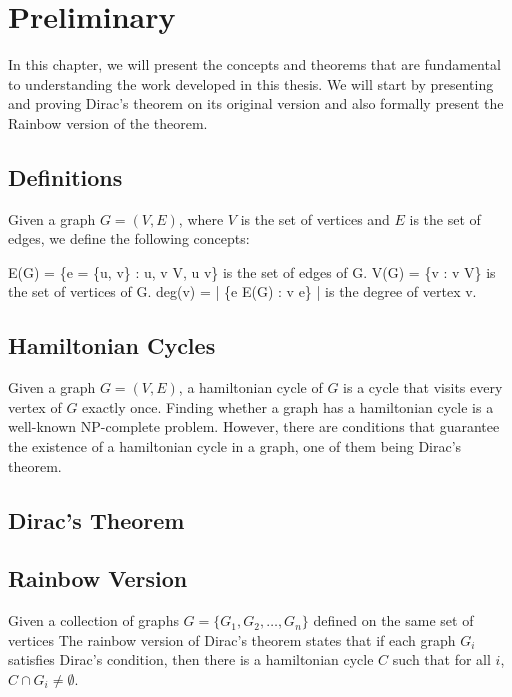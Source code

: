 
\chapter{Preliminary}

In this chapter, we will present the concepts and theorems that are fundamental to understanding the 
work developed in this thesis. We will start by presenting and proving Dirac's theorem on its original
version and also formally present the Rainbow version of the theorem.

\section{Definitions}

Given a graph $G = (V, E)$, where $V$ is the set of vertices and $E$ is the set of edges, we define the
following concepts:

E(G) = \{e = \{u, v\} : u, v \in V, u \neq v\} is the set of edges of G.
V(G) = \{v : v \in V\} is the set of vertices of G.
deg(v) = | \{e \in E(G) : v \in e\} | is the degree of vertex v.

\section{Hamiltonian Cycles}

Given a graph $G = (V, E)$, a hamiltonian cycle of $G$ is a cycle that visits every vertex of $G$ exactly once.
Finding whether a graph has a hamiltonian cycle is a well-known NP-complete problem. 
However, there are conditions that guarantee the existence of a hamiltonian cycle in a graph, one of them being Dirac's theorem.

\section{Dirac's Theorem}

\section{Rainbow Version}

Given a collection of graphs  $G = \{G_1, G_2, \ldots, G_n\}$ defined on the same set of vertices
The rainbow version of Dirac's theorem states that if each graph $G_i$ satisfies Dirac's condition, 
then there is a hamiltonian cycle $C$ such that for all $i$, $C \cap G_i \neq \emptyset$.
